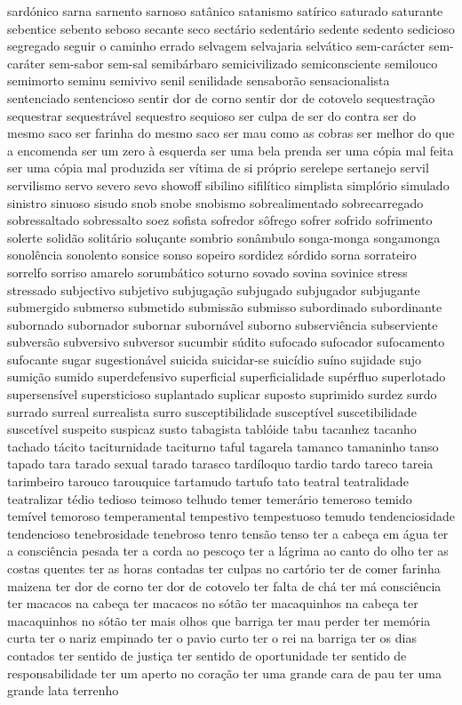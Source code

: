 \begin{appendices}
sard\'{o}nico sarna sarnento sarnoso sat\^{a}nico satanismo sat\'{i}rico saturado saturante sebentice sebento seboso secante seco sect\'{a}rio sedent\'{a}rio sedente sedento sedicioso segregado seguir o caminho errado selvagem selvajaria selv\'{a}tico sem-car\'{a}cter sem-car\'{a}ter sem-sabor sem-sal semib\'{a}rbaro semicivilizado semiconsciente semilouco semimorto seminu semivivo senil senilidade sensabor\~ao sensacionalista sentenciado sentencioso sentir dor de corno sentir dor de cotovelo sequestra\c{c}\~ao sequestrar sequestr\'{a}vel sequestro sequioso ser culpa de ser do contra ser do mesmo saco ser farinha do mesmo saco ser mau como as cobras ser melhor do que a encomenda ser um zero \`{a} esquerda ser uma bela prenda ser uma c\'{o}pia mal feita ser uma c\'{o}pia mal produzida ser v\'{i}tima de si pr\'{o}prio serelepe sertanejo servil servilismo servo severo sevo showoff sibilino sifil\'{i}tico simplista simpl\'{o}rio simulado sinistro sinuoso sisudo snob snobe snobismo sobrealimentado sobrecarregado sobressaltado sobressalto soez sofista sofredor s\^{o}frego sofrer sofrido sofrimento solerte solid\~ao solit\'{a}rio solu\c{c}ante sombrio son\^{a}mbulo songa-monga songamonga sonol\^{e}ncia sonolento sonsice sonso sopeiro sordidez s\'{o}rdido sorna sorrateiro sorrelfo sorriso amarelo sorumb\'{a}tico soturno sovado sovina sovinice stress stressado subjectivo subjetivo subjuga\c{c}\~ao subjugado subjugador subjugante submergido submerso submetido submiss\~ao submisso subordinado subordinante subornado subornador subornar suborn\'{a}vel suborno subservi\^{e}ncia subserviente subvers\~ao subversivo subversor sucumbir s\'{u}dito sufocado sufocador sufocamento sufocante sugar sugestion\'{a}vel suicida suicidar-se suic\'{i}dio su\'{i}no sujidade sujo sumi\c{c}\~ao sumido superdefensivo superficial superficialidade sup\'{e}rfluo superlotado supersens\'{i}vel supersticioso suplantado suplicar suposto suprimido surdez surdo surrado surreal surrealista surro susceptibilidade suscept\'{i}vel suscetibilidade suscet\'{i}vel suspeito suspicaz susto tabagista tabl\'{o}ide tabu tacanhez tacanho tachado t\'{a}cito taciturnidade taciturno taful tagarela tamanco tamaninho tanso tapado tara tarado sexual tarado tarasco tard\'{i}loquo tardio tardo tareco tareia tarimbeiro tarouco tarouquice tartamudo tartufo tato teatral teatralidade teatralizar t\'{e}dio tedioso teimoso telhudo temer temer\'{a}rio temeroso temido tem\'{i}vel temoroso temperamental tempestivo tempestuoso temudo tendenciosidade tendencioso tenebrosidade tenebroso tenro tens\~ao tenso ter a cabe\c{c}a em \'{a}gua ter a consci\^{e}ncia pesada ter a corda ao pesco\c{c}o ter a l\'{a}grima ao canto do olho ter as costas quentes ter as horas contadas ter culpas no cart\'{o}rio ter de comer farinha maizena ter dor de corno ter dor de cotovelo ter falta de ch\'{a} ter m\'{a} consci\^{e}ncia ter macacos na cabe\c{c}a ter macacos no s\'{o}t\~ao ter macaquinhos na cabe\c{c}a ter macaquinhos no s\'{o}t\~ao ter mais olhos que barriga ter mau perder ter mem\'{o}ria curta ter o nariz empinado ter o pavio curto ter o rei na barriga ter os dias contados ter sentido de justi\c{c}a ter sentido de oportunidade ter sentido de responsabilidade ter um aperto no cora\c{c}\~ao ter uma grande cara de pau ter uma grande lata terrenho 
\end{appendices}
